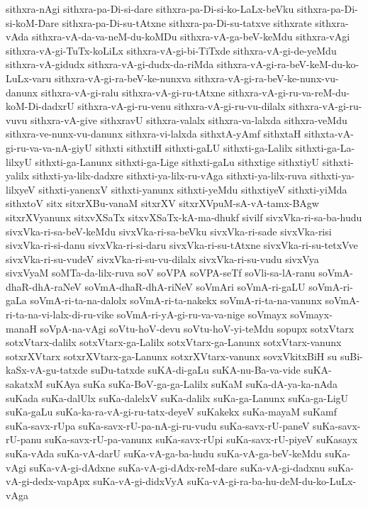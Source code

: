 {sithxra-nAgi
sithxra-pa-Di-si-dare
sithxra-pa-Di-si-ko-LaLx-beVku
sithxra-pa-Di-si-koM-Dare
sithxra-pa-Di-su-tAtxne
sithxra-pa-Di-su-tatxve
sithxrate
sithxra-vAda
sithxra-vA-da-va-neM-du-koMDu
sithxra-vA-ga-beV-keMdu
sithxra-vAgi
sithxra-vA-gi-TuTx-koLiLx
sithxra-vA-gi-bi-TiTxde
sithxra-vA-gi-de-yeMdu
sithxra-vA-gidudx
sithxra-vA-gi-dudx-da-riMda
sithxra-vA-gi-ra-beV-keM-du-ko-LuLx-varu
sithxra-vA-gi-ra-beV-ke-nunxva
sithxra-vA-gi-ra-beV-ke-nunx-vu-danunx
sithxra-vA-gi-ralu
sithxra-vA-gi-ru-tAtxne
sithxra-vA-gi-ru-va-reM-du-koM-Di-dadxrU
sithxra-vA-gi-ru-venu
sithxra-vA-gi-ru-vu-dilalx
sithxra-vA-gi-ru-vuvu
sithxra-vA-give
sithxravU
sithxra-valalx
sithxra-va-lalxda
sithxra-veMdu
sithxra-ve-nunx-vu-danunx
sithxra-vi-lalxda
sithxtA-yAmf
sithxtaH
sithxta-vA-gi-ru-va-va-nA-giyU
sithxti
sithxtiH
sithxti-gaLU
sithxti-ga-Lalilx
sithxti-ga-La-lilxyU
sithxti-ga-Lanunx
sithxti-ga-Lige
sithxti-gaLu
sithxtige
sithxtiyU
sithxti-yalilx
sithxti-ya-lilx-dadxre
sithxti-ya-lilx-ru-vAga
sithxti-ya-lilx-ruva
sithxti-ya-lilxyeV
sithxti-yanenxV
sithxti-yanunx
sithxti-yeMdu
sithxtiyeV
sithxti-yiMda
sithxtoV
sitx
sitxrXBu-vanaM
sitxrXV
sitxrXVpuM-sA-vA-tamx-BAgw
sitxrXVyanunx
sitxvXSaTx
sitxvXSaTx-kA-ma-dhukf
sivilf
sivxVka-ri-sa-ba-hudu
sivxVka-ri-sa-beV-keMdu
sivxVka-ri-sa-beVku
sivxVka-ri-sade
sivxVka-risi
sivxVka-ri-si-danu
sivxVka-ri-si-daru
sivxVka-ri-su-tAtxne
sivxVka-ri-su-tetxVve
sivxVka-ri-su-vudeV
sivxVka-ri-su-vu-dilalx
sivxVka-ri-su-vudu
sivxVya
sivxVyaM
soMTa-da-lilx-ruva
soV
soVPA
soVPA-seTf
soVli-sa-lA-ranu
soVmA-dhaR-dhA-raNeV
soVmA-dhaR-dhA-riNeV
soVmAri
soVmA-ri-gaLU
soVmA-ri-gaLa
soVmA-ri-ta-na-dalolx
soVmA-ri-ta-nakekx
soVmA-ri-ta-na-vanunx
soVmA-ri-ta-na-vi-lalx-di-ru-vike
soVmA-ri-yA-gi-ru-va-va-nige
soVmayx
soVmayx-manaH
soVpA-na-vAgi
soVtu-hoV-devu
soVtu-hoV-yi-teMdu
sopupx
sotxVtarx
sotxVtarx-dalilx
sotxVtarx-ga-Lalilx
sotxVtarx-ga-Lanunx
sotxVtarx-vanunx
sotxrXVtarx
sotxrXVtarx-ga-Lanunx
sotxrXVtarx-vanunx
sovxVkitxBiH
su
suBi-kaSx-vA-gu-tatxde
suDu-tatxde
suKA-di-gaLu
suKA-nu-Ba-va-vide
suKA-sakatxM
suKAya
suKa
suKa-BoV-ga-ga-Lalilx
suKaM
suKa-dA-ya-ka-nAda
suKada
suKa-dalUlx
suKa-dalelxV
suKa-dalilx
suKa-ga-Lanunx
suKa-ga-LigU
suKa-gaLu
suKa-ka-ra-vA-gi-ru-tatx-deyeV
suKakekx
suKa-mayaM
suKamf
suKa-savx-rUpa
suKa-savx-rU-pa-nA-gi-ru-vudu
suKa-savx-rU-paneV
suKa-savx-rU-panu
suKa-savx-rU-pa-vanunx
suKa-savx-rUpi
suKa-savx-rU-piyeV
suKasayx
suKa-vAda
suKa-vA-darU
suKa-vA-ga-ba-hudu
suKa-vA-ga-beV-keMdu
suKa-vAgi
suKa-vA-gi-dAdxne
suKa-vA-gi-dAdx-reM-dare
suKa-vA-gi-dadxnu
suKa-vA-gi-dedx-vapApx
suKa-vA-gi-didxVyA
suKa-vA-gi-ra-ba-hu-deM-du-ko-LuLx-vAga
}
